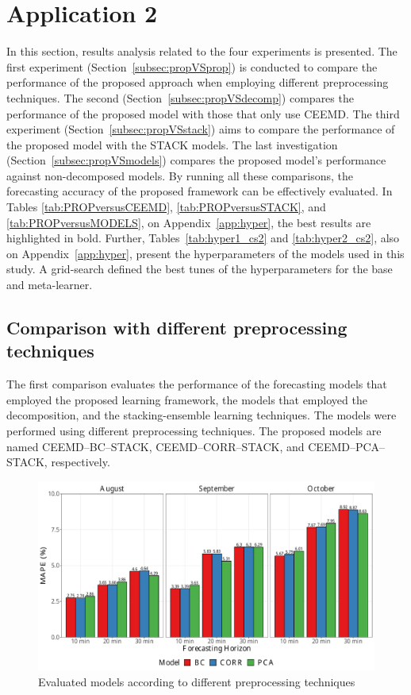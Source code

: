 \section{Application 2} \label{sec:case_study2}

In this section, results analysis related to the four experiments is presented. The first experiment (Section~\ref{subsec:propVSprop}) is conducted to compare the performance of the proposed approach when employing different preprocessing techniques. The second (Section~\ref{subsec:propVSdecomp}) compares the performance of the proposed model with those that only use \ac{CEEMD}. The third experiment (Section~\ref{subsec:propVSstack}) aims to compare the performance of the proposed model with the \ac{STACK} models. The last investigation (Section~\ref{subsec:propVSmodels}) compares the proposed model's performance against non-decomposed models. By running all these comparisons, the forecasting accuracy of the proposed framework can be effectively evaluated. In Tables \ref{tab:PROPversusCEEMD}, \ref{tab:PROPversusSTACK}, and \ref{tab:PROPversusMODELS}, on Appendix~\ref{app:hyper}, the best results are highlighted in bold. Further, Tables~\ref{tab:hyper1_cs2} and \ref{tab:hyper2_cs2}, also on Appendix~\ref{app:hyper}, present the hyperparameters of the models used in this study. A grid-search defined the best tunes of the hyperparameters for the base and meta-learner.

\subsection{Comparison with different preprocessing techniques \label{subsec:propVSprop}}

The first comparison evaluates the performance of the forecasting models that employed the proposed learning framework, the models that employed the decomposition, and the stacking-ensemble learning techniques. The models were performed using different preprocessing techniques. The proposed models are named \ac{CEEMD}--\ac{BC}--\ac{STACK}, \ac{CEEMD}--\ac{CORR}--\ac{STACK}, and \ac{CEEMD}--\ac{PCA}--\ac{STACK}, respectively.

\begin{figure}[htb!]
    \centering
    \includegraphics[width=\textwidth]{Media/cs2_mape_barplot.pdf}
    \caption{Evaluated models according to different preprocessing techniques}
    \label{fig:performance}
\end{figure}

